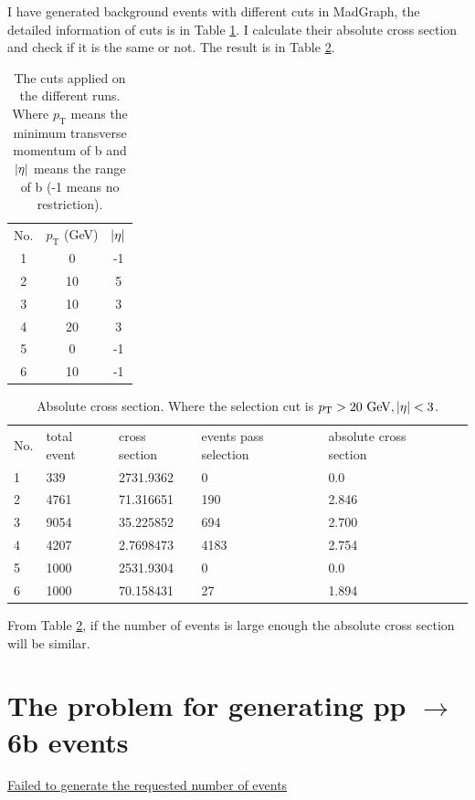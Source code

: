 \documentclass[12pt]{article}
\begin{document}
	I have generated background events with different cuts in MadGraph, the detailed information of cuts is in Table \ref{tab:cut_of_different_run}. I calculate their absolute cross section and check if it is the same or not. The result is in Table \ref{tab:absolute_cross_section}.

	\begin{table}[htpb]
		\centering
		\caption{The cuts applied on the different runs. Where $p_\text{T}$ means the minimum transverse momentum of b and $\abs{\eta}$ means the range of b (-1 means no restriction).}
		\label{tab:cut_of_different_run}
		\begin{tabular}{ccc}
			No.& $p_\text{T}$ (GeV) & $\abs{\eta}$  \\
			1 &      0       &           -1      \\
			2 &      10       &     5          \\
			3 &      10       &     3 \\
			4 &      20       &     3 \\
			5 &      0       &     -1 \\
			6 &      10       &     -1 
		\end{tabular}	
	\end{table}


	\begin{table}[htpb]
		\centering
		\caption{Absolute cross section. Where the selection cut is $p_\text{T}> \text{20 GeV}, \abs{\eta} < 3$.}
		\label{tab:absolute_cross_section}
		\begin{tabular}{llllll}
			No.& total event & cross section & events pass selection   & absolute cross section \\
			1& 339 & 2731.9362 & 0 & 0.0    \\
			2& 4761 & 71.316651 & 190 & 2.846   \\
			3& 9054 & 35.225852 & 694 & 2.700 \\
			4& 4207 & 2.7698473 & 4183 & 2.754 \\
			5& 1000 & 2531.9304 & 0 & 0.0 \\
			6& 1000 & 70.158431 & 27 & 1.894
		\end{tabular}	
	\end{table}

	From Table \ref{tab:absolute_cross_section}, if the number of events is large enough the absolute cross section will be similar.
\section{The problem for generating \texorpdfstring{pp $\to$ 6b}{pp to 6b} events}%
\label{sec:the_problem_for_generating_pp_6b_events}
	\href{https://answers.launchpad.net/mg5amcnlo/+question/701314}{Failed to generate the requested number of events}
\end{document}
